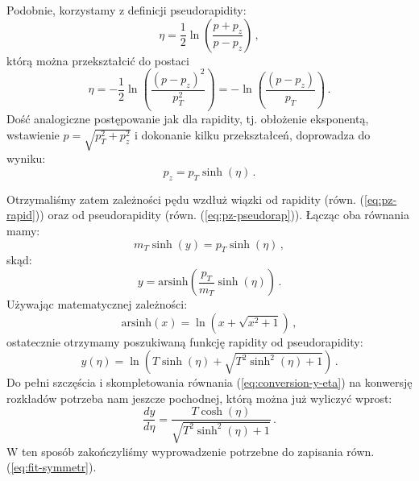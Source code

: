 \documentclass[a4paper,12pt]{article}
\begin{document}
Podobnie, korzystamy z definicji pseudorapidity:
\begin{equation} \label{eq:pseudorap}
\eta = \frac{1}{2} \ln \left( \frac{p + p_z}{p - p_z} \right)\,,
\end{equation}
którą można przekształcić do postaci
\begin{equation} \label{eq:pseudorap1}
\eta = -\frac{1}{2} \ln \left( \frac{(p - p_z)^2}{p_T^2} \right) = -\ln \left( \frac{(p - p_z)}{p_T} \right) \,.
\end{equation}
Dość analogiczne postępowanie jak dla rapidity, tj. obłożenie eksponentą, wstawienie $p = \sqrt{p_T^2 + p_z^2}$ i dokonanie kilku przekształceń, doprowadza do wyniku:
\begin{equation} \label{eq:pz-pseudorap}
p_z = p_{T} \sinh(\eta)\,.
\end{equation}

Otrzymaliśmy zatem zależności pędu wzdłuż wiązki od rapidity (równ. (\ref{eq:pz-rapid})) oraz od pseudorapidity (równ. (\ref{eq:pz-pseudorap})). Łącząc oba równania mamy:
\begin{equation} \label{eq:pz-rapid-pseudorapid}
m_{T} \sinh(y) = p_{T} \sinh(\eta)\,,
\end{equation}
skąd:
\begin{equation} \label{eq:rapid-pseudorapid-1}
y = \text{arsinh}\left(\frac{p_{T}}{m_T} \sinh(\eta)\right)\,.
\end{equation}
Używając matematycznej zależności:
\begin{equation} \label{eq:arcsinh}
\text{arsinh}(x) =  \ln\left(x + \sqrt{x^2 + 1} \right) \,,
\end{equation}
ostatecznie otrzymamy poszukiwaną funkcję rapidity od pseudorapidity:
\begin{equation} \label{eq:rapid-pseudorapid}
y(\eta) = \ln\left(T\sinh(\eta) + \sqrt{T^2\sinh^2(\eta) + 1} \right) \,.
\end{equation}
Do pełni szczęścia i skompletowania równania (\ref{eq:conversion-y-eta}) na konwersję rozkładów potrzeba nam jeszcze pochodnej, którą można już wyliczyć wprost:
\begin{equation} \label{eq:rapid-pseudorapid-deriv}
\frac{dy}{d\eta} = \frac{T\cosh(\eta)}{\sqrt{T^2\sinh^2(\eta) + 1}} \,.
\end{equation}
W ten sposób zakończyliśmy wyprowadzenie potrzebne do zapisania równ. (\ref{eq:fit-symmetr}).
\end{document}
